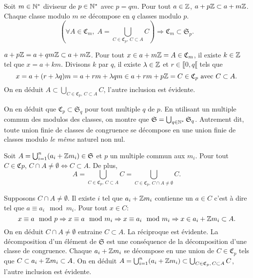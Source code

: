 \begin{propn} \label{décompoClasse}
 Soit $m\in \mathbb{N}^*$ diviseur de $p\in \mathbb{N}^*$ avec $p=qm$.\newline
 Pour tout $a\in \mathbb{Z}$, $a + p\mathbb{Z} \subset a + m\mathbb{Z}$. Chaque classe modulo $m$ se décompose en $q$ classes modulo $p$.
 \begin{displaymath}
  \left( \forall A\in \mathfrak{C}_m, \;  A = \bigcup_{C \in \mathfrak{C}_p,\, C\subset A} C \right) \Rightarrow \mathfrak{C}_m \subset \mathfrak{S}_p.
 \end{displaymath}
\end{propn}
\begin{demo}
 $a + p \mathbb{Z} = a + qm\mathbb{Z} \subset a + m\mathbb{Z}$. Pour tout $x \in  a + m\mathbb{Z} = A \in \mathfrak{C}_m$, il existe $k \in \mathbb{Z}$ tel que $x = a + km$. Divisons $k$ par $q$, il existe $\lambda \in \mathbb{Z}$ et $r \in \llbracket 0, q\llbracket$ tels que
 \begin{displaymath}
  x = a + (r+\lambda q)m = a+rm + \lambda qm \in a+rm + p \mathbb{Z} = C \in \mathfrak{C}_p \text{ avec } C \subset A.
 \end{displaymath}
 On en déduit $A \subset \bigcup_{C \in \mathfrak{C}_p,\, C\subset A} C$, l'autre inclusion est évidente.
\end{demo}
 \label{ExpleZ}
 \noindent On en déduit que $\mathfrak{C}_p \subset \mathfrak{S}_q$ pour tout multiple $q$ de $p$. En utilisant un multiple commun des modulos des classes, on montre que $\mathfrak{S}= \bigcup_{q \in \mathbb{N}^*}\mathfrak{S}_q$. Autrement dit, toute union finie de classes de congruence se décompose en une union finie de classes modulo \emph{le même} naturel non nul.
 \label{DecompUnionClasses}
 \begin{propn}
  Soit $A=\bigcup_{i=1}^n(a_i + \mathbb{Z} m_i) \in \mathfrak{S}$ et $p$ un multiple commun aux $m_i$.\newline
  Pour tout $C \in \mathfrak{C}p$, $C \cap A \neq \emptyset \Leftrightarrow C \subset A$. De plus,
  \begin{displaymath}
   A = \bigcup_{C \in \mathfrak{C}_p,\, C\subset A} C = \bigcup_{C \in \mathfrak{C}_p,\, C\cap A \neq \emptyset} C.
  \end{displaymath}
 \end{propn}
 \begin{demo}
  Supposons $C\cap A \neq \emptyset$. Il existe $i$ tel que $a_i + \mathbb{Z} m_i$ contienne un $a \in C$ c'est à dire tel que $a \equiv a_i \mod m_i$. Pour tout $x \in C$:
  \begin{displaymath}
   x \equiv a \mod p \Rightarrow x \equiv a \mod m_i \Rightarrow x \equiv a_i \mod m_i \Rightarrow x \in a_i + \mathbb{Z} m_i \subset A.
  \end{displaymath}
  On en déduit $C \cap A \neq \emptyset$ entraine $C \subset A$. La réciproque est évidente.\newline
  La décomposition d'un élément de $\mathfrak{S}$ est une conséquence de la décomposition d'une classe de congruence. Chaque $a_i + \mathbb{Z} m_i$ se décompose en une union de $C\in \mathfrak{C}_p$ tels que $C \subset a_i + \mathbb{Z} m_i \subset A$. On en déduit $A = \bigcup_{i=1}^n(a_i + \mathbb{Z} m_i) \subset \bigcup_{C \in \mathfrak{C}_p,\, C\subset A} C$, l'autre inclusion est évidente.
 \end{demo}


